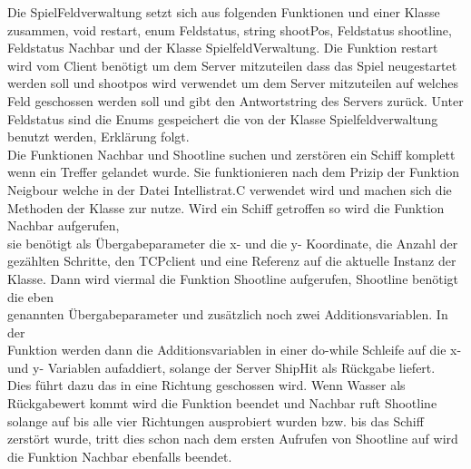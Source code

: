 Die SpielFeldverwaltung setzt sich aus folgenden Funktionen und einer Klasse\\ zusammen,
void restart, enum Feldstatus, string shootPos, Feldstatus shootline, \\Feldstatus Nachbar und der Klasse SpielfeldVerwaltung.
Die Funktion restart wird vom Client benötigt um dem Server mitzuteilen dass das Spiel neugestartet werden soll und shootpos wird verwendet um dem Server mitzuteilen auf welches Feld 
geschossen werden soll und gibt den Antwortstring des Servers zurück. Unter Feldstatus sind die Enums gespeichert die von der Klasse Spielfeldverwaltung benutzt werden, Erklärung 
folgt. \\Die Funktionen Nachbar und Shootline suchen und zerstören ein Schiff komplett wenn ein Treffer gelandet wurde. Sie funktionieren nach dem Prizip der Funktion Neigbour welche 
in der Datei Intellistrat.C verwendet wird und machen sich die Methoden der Klasse zur nutze. Wird ein Schiff getroffen so wird die Funktion Nachbar aufgerufen, \\sie benötigt als 
Übergabeparameter die x- und die y- Koordinate, die Anzahl der \\gezählten Schritte, den TCPclient und eine Referenz auf die aktuelle Instanz der Klasse. Dann wird viermal die Funktion 
Shootline aufgerufen, Shootline benötigt die eben \\genannten Übergabeparameter und zusätzlich noch zwei Additionsvariablen. In der \\Funktion werden dann die Additionsvariablen in einer 
do-while Schleife auf die x- und y- Variablen aufaddiert, solange der Server ShipHit als Rückgabe liefert. \\Dies führt dazu das in eine Richtung geschossen wird. Wenn Wasser als 
Rückgabewert kommt wird die Funktion beendet und Nachbar ruft Shootline solange auf bis alle vier Richtungen ausprobiert wurden bzw. bis das Schiff zerstört wurde, tritt dies schon 
nach dem ersten Aufrufen von Shootline auf wird die Funktion Nachbar ebenfalls beendet.

